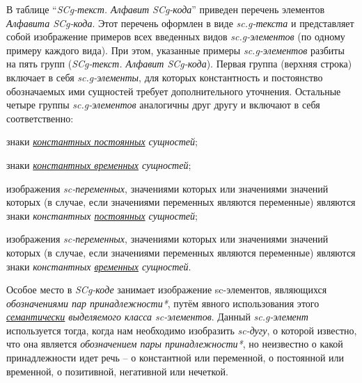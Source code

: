 \begin{SCn}
\end{SCn}

В таблице ``\textit{SCg-текст. Алфавит SCg-кода}'' приведен перечень элементов \textit{Алфавита SCg-кода}.
Этот перечень оформлен в виде \textit{sc.g-текста} и представляет собой изображение примеров всех введенных видов \textit{sc.g-элементов} (по одному примеру каждого вида). При этом, указанные примеры \textit{sc.g-элементов} разбиты на пять групп (\textit{SCg-текст. Алфавит SCg-кода}). Первая группа (верхняя строка) включает в себя \textit{sc.g-элементы}, для которых константность и постоянство обозначаемых ими сущностей требует дополнительного уточнения. Остальные четыре группы \textit{sc.g-элементов} аналогичны друг другу и включают в себя соответственно:

\begin{textitemize}
	\item знаки \textit{\uline{константных постоянных} сущностей};
	\item знаки \textit{\uline{константных временных} сущностей};
	\item изображения \textit{sc-переменных}, значениями которых или значениями значений которых (в случае, если значениями переменных являются переменные) являются знаки \textit{константных \uline{постоянных} сущностей};
	\item изображения \textit{sc-переменных}, значениями которых или значениями значений которых (в случае, если значениями переменных являются переменные) являются знаки \textit{константных \uline{временных} сущностей}.
\end{textitemize}

Особое место в \textit{SCg-коде} занимает изображение sc-элементов, являющихся \textit{обозначениями пар принадлежности*}, путём явного использования этого \textit {\uline{семантически} выделяемого класса sc-элементов}.
Данный \textit{sc.g-элемент} используется тогда, когда нам необходимо изобразить \textit{sc-дугу}, о которой известно, что она является \textit{обозначением пары принадлежности*}, но неизвестно о какой принадлежности идет речь -- о константной или переменной, о постоянной или временной, о позитивной, негативной или нечеткой.

